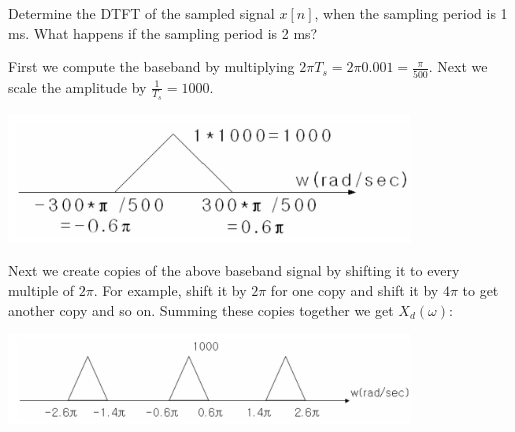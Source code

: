 \documentclass[11pt]{article}
\begin{document}
Determine the DTFT of the sampled signal $x[n]$, when the sampling period is 1 ms. What happens if the sampling period is 2 ms?


{\color{blue}
First we compute the baseband by multiplying $2 \pi T_s = 2 \pi 0.001 = \frac{\pi}{500}$. Next we scale the amplitude by $\frac{1}{T_s} = 1000$. 

\includegraphics[width = 0.8\textwidth]{CTFT_p4_a.png} 

Next we create copies of the above baseband signal by shifting it to every multiple of $2 \pi$. For example, shift it by $2 \pi$ for one copy and shift it by $4 \pi$ to get another copy and so on. Summing these copies together we get $X_d(\omega)$:

\includegraphics[width = 0.8\textwidth]{CTFT_p4_d.png} 

}
\end{document}
